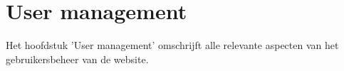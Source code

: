 
\section{User management}\label{usermanagement}

Het hoofdstuk 'User management' omschrijft alle relevante aspecten van het gebruikersbeheer van de website.



